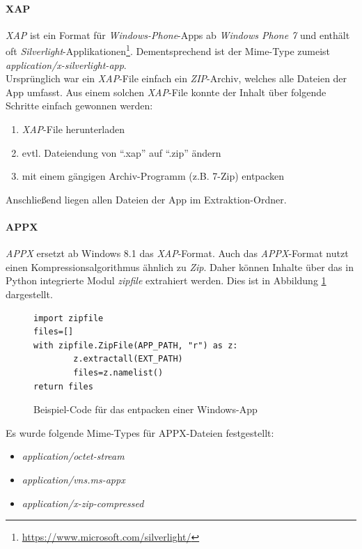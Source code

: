 \paragraph{XAP}
\textit{XAP} ist ein Format für \textit{Windows-Phone}-Apps ab \textit{Windows Phone 7} und enthält oft \textit{Silverlight}-Applikationen\footnote{\url{https://www.microsoft.com/silverlight/}}. Dementsprechend ist der Mime-Type zumeist \textit{application/x-silverlight-app}.\\

Ursprünglich war ein \textit{XAP}-File einfach ein \textit{ZIP}-Archiv, welches alle Dateien der App umfasst. Aus einem solchen \textit{XAP}-File konnte der Inhalt über folgende Schritte einfach gewonnen werden:
\begin{enumerate}
	\item \textit{XAP}-File herunterladen
	\item evtl. Dateiendung von "`.xap"' auf "`.zip"' ändern
	\item mit einem gängigen Archiv-Programm (z.B. 7-Zip) entpacken
\end{enumerate}
Anschließend liegen allen Dateien der App im Extraktion-Ordner.\\

\paragraph{APPX}
\textit{APPX} ersetzt ab Windows 8.1 das \textit{XAP}-Format. Auch das \textit{APPX}-Format nutzt einen Kompressionsalgorithmus ähnlich zu \textit{Zip}. Daher können Inhalte über das in Python integrierte Modul \textit{zipfile} extrahiert werden. Dies ist in Abbildung \ref{lst:WeitMobSFWinAPPXExtract} dargestellt.\\

\begin{figure}
\begin{lstlisting}
import zipfile
files=[]
with zipfile.ZipFile(APP_PATH, "r") as z:
        z.extractall(EXT_PATH)
        files=z.namelist()
return files
\end{lstlisting}
\caption{Beispiel-Code für das entpacken einer Windows-App}
\label{lst:WeitMobSFWinAPPXExtract}
\end{figure}

Es wurde folgende Mime-Types für APPX-Dateien festgestellt:
\begin{itemize}
    \item \textit{application/octet-stream}
    \item \textit{application/vns.ms-appx}
    \item \textit{application/x-zip-compressed}
\end{itemize}

